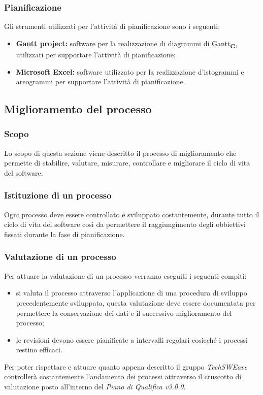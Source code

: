 \subsubsection{Pianificazione}
Gli strumenti utilizzati per l'attività di pianificazione sono i seguenti:
\begin{itemize}
    \item \textbf{Gantt project:} software per la realizzazione di diagrammi di Gantt\textsubscript{\textbf{G}}, utilizzati per supportare l'attività di pianificazione;
    \item \textbf{Microsoft Excel:} software utilizzato per la realizzazione d'istogrammi e areogrammi per supportare l'attività di pianificazione.
\end{itemize}
\subsection{Miglioramento del processo}
\subsubsection{Scopo}
Lo scopo di questa sezione viene descritto il processo di miglioramento che permette di stabilire, valutare, misurare, controllare e migliorare il ciclo di vita del software.
\subsubsection{Istituzione di un processo}
Ogni processo deve essere controllato e sviluppato costantemente, durante tutto il ciclo di vita del software così da permettere il raggiungimento degli obbiettivi fissati durante la fase di pianificazione.
\subsubsection{Valutazione di un processo}
Per attuare la valutazione di un processo verranno eseguiti i seguenti compiti:
\begin{itemize}
    \item si valuta il processo attraverso l'applicazione di una procedura di sviluppo precedentemente sviluppata, questa valutazione deve essere documentata per permettere la conservazione dei dati e il successivo miglioramento del processo;
    \item le revisioni devono essere pianificate a intervalli regolari cosicché i processi restino efficaci.
\end{itemize}
Per poter rispettare e attuare quanto appena descritto il gruppo \textit{TechSWEave} controllerà costantemente l'andamento dei processi attraverso il cruscotto di valutazione posto all'interno del \textit{Piano di Qualifica v3.0.0}.
